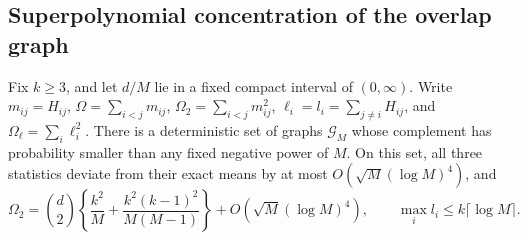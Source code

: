 \subsection{Superpolynomial concentration of the overlap graph}
\begin{lemma}\label{lem:mdconc}\label{lem:conc}
Fix $k\ge3$, and let $d/M$ lie in a fixed compact interval of $(0,\infty)$. Write $m_{ij}=H_{ij}$, $\Omega=\sum_{i<j}m_{ij}$, $\Omega_2=\sum_{i<j}m_{ij}^2$, $\ell_i=l_i=\sum_{j\ne i}H_{ij}$, and $\Omega_\ell=\sum_i\ell_i^2$. There is a deterministic set of graphs $\mathcal G_M$ whose complement has probability smaller than any fixed negative power of $M$. On this set, all three statistics deviate from their exact means by at most $O(\sqrt M(\log M)^4)$, and
\begin{equation*}
\Omega_2=\binom d2\left\{\frac{k^2}M+\frac{k^2(k-1)^2}{M(M-1)}\right\}+O(\sqrt M(\log M)^4),\qquad
\max_i l_i\le k\lceil\log M\rceil.
\end{equation*}
\end{lemma}

